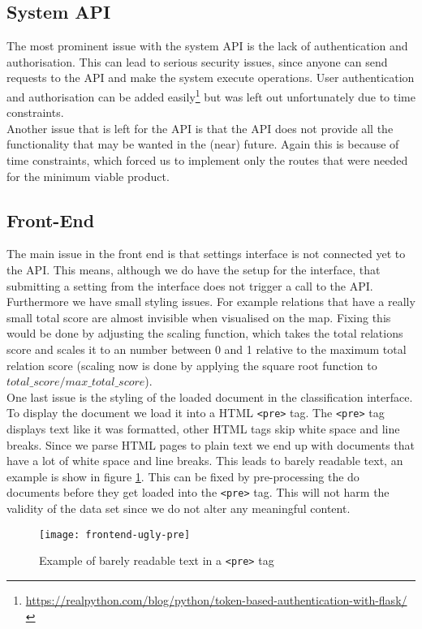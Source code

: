 \subsection{System API}
The most prominent issue with the system API is the lack of authentication and authorisation. This can lead to serious security issues, since anyone can send requests to the API and make the system execute operations. User authentication and authorisation can be added easily\footnote{\url{https://realpython.com/blog/python/token-based-authentication-with-flask/}} but was left out unfortunately due to time constraints.\\
Another issue that is left for the API is that the API does not provide all the functionality that may be wanted in the (near) future. Again this is because of time constraints, which forced us to implement only the routes that were needed for the minimum viable product.

\subsection{Front-End}
The main issue in the front end is that settings interface is not connected yet to the API. This means, although we do have the setup for the interface, that submitting a setting from the interface does not trigger a call to the API.\\
Furthermore we have small styling issues. For example relations that have a really small total score are almost invisible when visualised on the map. Fixing this would be done by adjusting the scaling function, which takes the total relations score and scales it to an number between 0 and 1 relative to the maximum total relation score (scaling now is done by applying the square root function to $total\_score/max\_total\_score$).\\
One last issue is the styling of the loaded document in the classification interface. To display the document we load it into a HTML \texttt{<pre>} tag. The \texttt{<pre>} tag displays text like it was formatted, other HTML tags skip white space and line breaks. Since we parse HTML pages to plain text we end up with documents that have a lot of white space and line breaks. This leads to barely readable text, an example is show in figure \ref{fig:ugly-pre}. This can be fixed by pre-processing the do documents before they get loaded into the \texttt{<pre>} tag. This will not harm the validity of the data set since we do not alter any meaningful content.

\begin{figure}[H]
\centering
\texttt{[image: frontend-ugly-pre]}
\caption{Example of barely readable text in a \texttt{<pre>} tag}
\label{fig:ugly-pre}
\end{figure}


